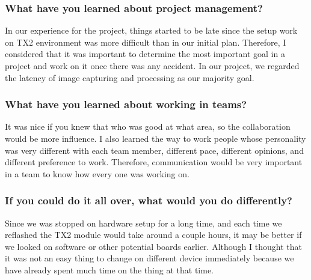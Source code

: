 \subsubsection{What have you learned about project management?}
In our experience for the project, things started to be late since the setup work on TX2 environment was 
more difficult than in our initial plan. Therefore, I considered that it was important to determine the 
most important goal in a project and work on it once there was any accident. In our project, we regarded 
the latency of image capturing and processing as our majority goal. \\

\subsubsection{What have you learned about working in teams?}
It was nice if you knew that who was good at what area, so the collaboration would be more influence. 
I also learned the way to work people whose personality was very different with each team member, different 
pace, different opinions, and different preference to work. Therefore, communication would be very important 
in a team to know how every one was working on. \\

\subsubsection{If you could do it all over, what would you do differently?}
Since we was stopped on hardware setup for a long time, and each time we reflashed the TX2 module would 
take around a couple hours, it may be better if we looked on software or other potential boards earlier. 
Although I thought that it was not an easy thing to change on different device immediately because we have 
already spent much time on the thing at that time. \\